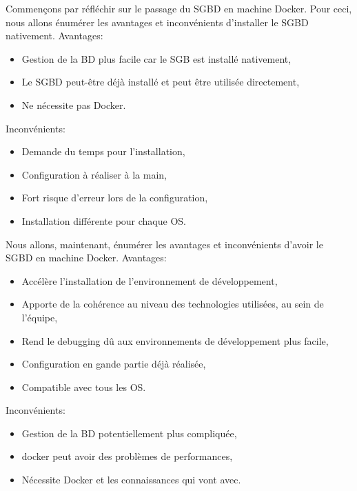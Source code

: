 \documentclass[
    iai, %
    il, %
]{heig-tb}
\begin{document}
Commençons par réfléchir sur le passage du SGBD en machine Docker.
Pour ceci, nous allons énumérer les avantages et inconvénients d'installer le SGBD nativement.
Avantages:
\begin{itemize}
    \item Gestion de la BD plus facile car le SGB est installé nativement,
    \item Le SGBD peut-être déjà installé et peut être utilisée directement,
    \item Ne nécessite pas Docker.
\end{itemize}

Inconvénients:
\begin{itemize}
    \item Demande du temps pour l'installation,
    \item Configuration à réaliser à la main,
    \item Fort risque d'erreur lors de la configuration,
    \item Installation différente pour chaque OS.
\end{itemize}

Nous allons, maintenant, énumérer les avantages et inconvénients d'avoir le SGBD en machine Docker.
Avantages:
\begin{itemize}
    \item Accélère l'installation de l'environnement de développement, \cite{labrecque}
    \item Apporte de la cohérence au niveau des technologies utilisées, au sein de l'équipe, \cite{labrecque}
    \item Rend le debugging dû aux environnements de développement plus facile, \cite{labrecque}
    \item Configuration en gande partie déjà réalisée,
    \item Compatible avec tous les OS.
\end{itemize}

Inconvénients:
\begin{itemize}
    \item Gestion de la BD potentiellement plus compliquée,
    \item \Gls{docker} peut avoir des problèmes de performances, \cite{labrecque}
    \item Nécessite Docker et les connaissances qui vont avec. \cite{labrecque}
\end{itemize}
\end{document}

